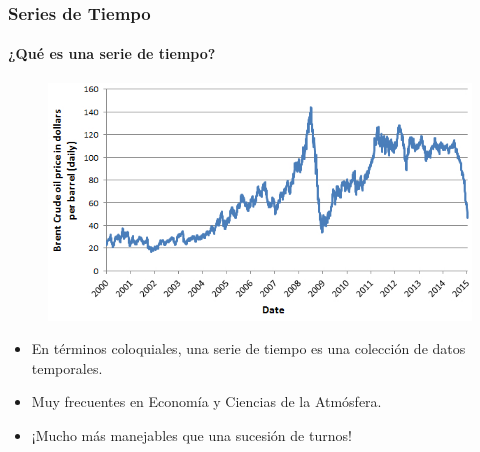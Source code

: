 \begin{frame}
  \frametitle{Series de Tiempo}
  \framesubtitle{¿Qué es una serie de tiempo?}

  \begin{figure}[t]
    \includegraphics[scale=0.35]{images/oil_price.jpg}
  \end{figure}

  \begin{itemize}
     \item En términos coloquiales, una serie de tiempo es una colección de datos temporales.
     \item Muy frecuentes en Economía y Ciencias de la Atmósfera.
     \item ¡Mucho más manejables que una sucesión de turnos!
   \end{itemize}
\end{frame}



